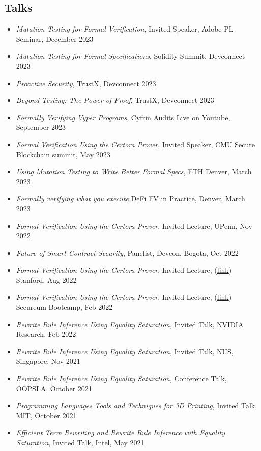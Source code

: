 \documentclass[margin, 10pt]{res} %
\begin{document}
\begin{resume}
\section{Talks}
 \begin{itemize}[itemsep=.7pt]
 \item{\sl Mutation Testing for Formal Verification}, Invited Speaker, Adobe PL Seminar, December 2023
 \item{\sl Mutation Testing for Formal Specifications}, Solidity Summit, Devconnect 2023
 \item{\sl Proactive Security}, TrustX, Devconnect 2023
 \item{\sl Beyond Testing: The Power of Proof}, TrustX, Devconnect 2023
 \item{\sl Formally Verifying Vyper Programs}, Cyfrin Audits Live on Youtube, September 2023
 \item{\sl Formal Verification Using the Certora Prover}, Invited Speaker, CMU Secure Blockchain summit, May 2023
 \item{\sl Using Mutation Testing to Write Better Formal Specs}, ETH Denver, March 2023
 \item{\sl Formally verifying what you execute} DeFi FV in Practice, Denver, March 2023
 \item{\sl Formal Verification Using the Certora Prover}, Invited Lecture, UPenn, Nov 2022
 \item{\sl Future of Smart Contract Security}, Panelist, Devcon, Bogota, Oct 2022
 \item {\sl Formal Verification Using the Certora Prover}, Invited Lecture,
   (\href{https://www.certora.com/events/certora-prover-2-day-workshop/}{link})
   Stanford, Aug 2022
 \item {\sl Formal Verification Using the Certora Prover}, Invited Lecture,
   (\href{https://github.com/Certora/Tutorials/tree/master/05.Lesson_GettingFamiliarWithCVT}{link})
   Secureum Bootcamp, Feb 2022
 \item {\sl Rewrite Rule Inference Using Equality Saturation}, Invited Talk, NVIDIA Research, Feb 2022
 \item {\sl Rewrite Rule Inference Using Equality Saturation}, Invited Talk, NUS, Singapore, Nov 2021
 \item {\sl Rewrite Rule Inference Using Equality Saturation}, Conference Talk, OOPSLA, October 2021
 \item {\sl Programming Languages Tools and Techniques for 3D Printing}, Invited Talk, MIT, October 2021
 \item {\sl Efficient Term Rewriting and Rewrite Rule Inference with Equality Saturation}, Invited Talk, Intel, May 2021

\end{itemize}
\end{resume}
\end{document}
